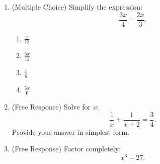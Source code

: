 \documentclass[12pt]{article}
\begin{document}
\begin{enumerate}[label=\textbf{Question \arabic*:}]
  \item (Multiple Choice) Simplify the expression:
    \[
    \frac{3x}{4} - \frac{2x}{3}.
    \]
    \begin{enumerate}[label=(\Alph*)]
      \item \(\frac{x}{12}\)
      \item \(\frac{5x}{12}\)
      \item \(\frac{x}{6}\)
      \item \(\frac{5x}{6}\)
    \end{enumerate}
    
  \item (Free Response) Solve for \(x\):
    \[
    \frac{1}{x} + \frac{1}{x+2} = \frac{3}{4}.
    \]
    Provide your answer in simplest form.
    
  \item (Free Response) Factor completely:
    \[
    x^3 - 27.
    \]
\end{enumerate}



\newpage
\end{document}

